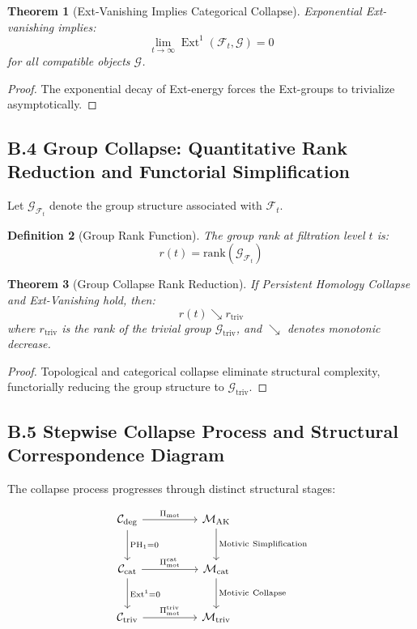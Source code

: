 \documentclass[11pt]{article}
\newtheorem{theorem}{Theorem}[section]
\newtheorem{definition}[theorem]{Definition}
\DeclareMathOperator{\Ext}{Ext}
\begin{document}
\begin{theorem}[Ext-Vanishing Implies Categorical Collapse]
Exponential Ext-vanishing implies:
\[
\lim_{t \to \infty} \Ext^1(\mathcal{F}_t, \mathcal{G}) = 0
\]
for all compatible objects $\mathcal{G}$.
\end{theorem}

\begin{proof}
The exponential decay of Ext-energy forces the Ext-groups to trivialize asymptotically.
\end{proof}

\subsection*{B.4 Group Collapse: Quantitative Rank Reduction and Functorial Simplification}

Let $\mathcal{G}_{\mathcal{F}_t}$ denote the group structure associated with $\mathcal{F}_t$.

\begin{definition}[Group Rank Function]
The group rank at filtration level $t$ is:
\[
r(t) = \mathrm{rank}(\mathcal{G}_{\mathcal{F}_t})
\]
\end{definition}

\begin{theorem}[Group Collapse Rank Reduction]
If Persistent Homology Collapse and Ext-Vanishing hold, then:
\[
r(t) \searrow r_{\mathrm{triv}}
\]
where $r_{\mathrm{triv}}$ is the rank of the trivial group $\mathcal{G}_{\mathrm{triv}}$, and $\searrow$ denotes monotonic decrease.
\end{theorem}

\begin{proof}
Topological and categorical collapse eliminate structural complexity, functorially reducing the group structure to $\mathcal{G}_{\mathrm{triv}}$.
\end{proof}

\subsection*{B.5 Stepwise Collapse Process and Structural Correspondence Diagram}

The collapse process progresses through distinct structural stages:

\[
\begin{tikzcd}[column sep=huge, row sep=large]
\mathcal{C}_{\mathrm{deg}} \arrow[r, "\Pi_{\mathrm{mot}}"] \arrow[d, "\mathrm{PH}_1 = 0"]
& \mathcal{M}_{\mathrm{AK}} \arrow[d, "\mathrm{Motivic\ Simplification}"] \\
\mathcal{C}_{\mathrm{cat}} \arrow[r, "\Pi_{\mathrm{mot}}^{\mathrm{cat}}"] \arrow[d, "\Ext^1 = 0"]
& \mathcal{M}_{\mathrm{cat}} \arrow[d, "\mathrm{Motivic\ Collapse}"] \\
\mathcal{C}_{\mathrm{triv}} \arrow[r, "\Pi_{\mathrm{mot}}^{\mathrm{triv}}"]
& \mathcal{M}_{\mathrm{triv}}
\end{tikzcd}
\]
\end{document}
